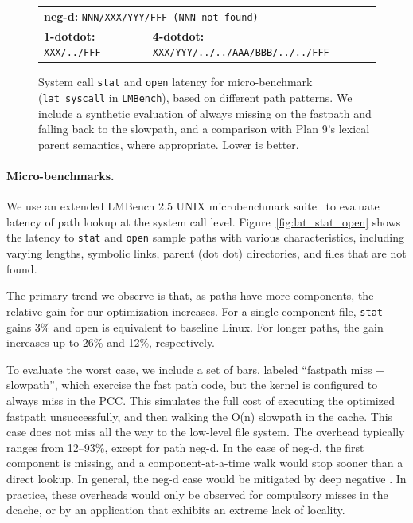 \begin{figure}
\begin{tabular}{lll}
\multicolumn{3}{l}{\scriptsize {\bf neg-d:} \tt NNN/XXX/YYY/FFF (NNN not found)} \\
{\scriptsize {\bf 1-dotdot:} \tt XXX/../FFF} &
\multicolumn{2}{l}{\scriptsize {\bf 4-dotdot:} \tt XXX/YYY/../../AAA/BBB/../../FFF} \\
\end{tabular}
\caption{System call {\tt stat} and {\tt open} latency for micro-benchmark ({\tt lat\_syscall} in {\tt LMBench}), based on different path patterns. 
We include a synthetic evaluation of always missing on the fastpath and falling back to the slowpath,
and a comparison with Plan 9's lexical parent semantics, where appropriate.
Lower is better.}
\label{fig:dcache:lat-stat-open}
\end{figure}

\paragraph{Micro-benchmarks.}
We use an extended LMBench 2.5 UNIX microbenchmark suite~\citep{McVoy:lmbench}
to evaluate latency of path lookup at the system call level.
Figure~\ref{fig:lat_stat_open} shows the latency to 
{\tt stat} and {\tt open} sample paths with various characteristics, 
including varying lengths, symbolic links, parent (dot dot) directories, 
and files that are not found.

The primary trend we observe is that, as paths have more components, 
the relative gain for our optimization increases.
For a single component file, {\tt stat} gains 3\% and open 
is equivalent to baseline Linux.
For longer paths, the gain increases up to 26\% and 12\%, respectively.


To evaluate the worst case, we include a set of bars, labeled ``fastpath miss + slowpath'', 
which exercise the fast path code, but the kernel is configured to always
miss in the PCC.  This simulates the full cost of executing the optimized fastpath unsuccessfully,
and then walking the O(n) slowpath in the cache.  This case 
does not miss all the way to the low-level file system.
The overhead typically ranges from 12--93\%,
except for path neg-d.
In the case of neg-d, the first component is missing, and a component-at-a-time walk
would stop sooner than a direct lookup. 
In general, the neg-d case would be mitigated by deep negative \dentries{}.
In practice, these overheads would only be observed 
for compulsory misses in the dcache, or by an application that exhibits
an extreme lack of locality.  

